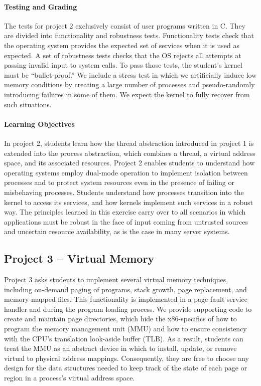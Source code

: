 \paragraph{Testing and Grading}
The tests for project 2 exclusively consist of user programs written in C.
They are divided into functionality and robustness tests.  Functionality tests check that
the operating system provides the expected set of services when it is used as
expected.  A set of robustness tests checks that the OS rejects all attempts at passing
invalid input to system calls.  To pass those tests, the student's kernel must be 
``bullet-proof.'' We include a stress test in which we artificially induce low memory
conditions by creating a large number of processes and pseudo-randomly introducing
failures in some of them.  We expect the kernel to fully recover from such situations.

\paragraph{Learning Objectives}
In project 2, students learn how the thread abstraction introduced in project 1 is 
extended into the process abstraction, which combines a thread, a virtual address space, 
and its associated resources.
Project 2 enables students to understand how operating systems employ dual-mode
operation to implement isolation between processes and to protect system resources
even in the presence of failing or misbehaving processes.  
Students understand how processes transition into the kernel to access its services,
and how kernels implement such services in a robust way.
The principles learned in this exercise carry over to all scenarios
in which applications must be robust in the face of input coming from untrusted 
sources and uncertain resource availability, as is the case in many server systems.

\subsection{Project 3 -- Virtual Memory}
Project 3 asks students to implement several virtual memory techniques, including
on-demand paging of programs, stack growth, page replacement, and memory-mapped files.
This functionality is implemented in a page fault service handler and during the
program loading process.
We provide supporting code to create and maintain page directories, which hide
the x86-specifics of how to program the memory management unit (MMU) and how
to ensure consistency with the CPU's translation look-aside buffer (TLB).  
As a result, students can treat the MMU as an abstract device in which to 
install, update, or remove virtual to physical address mappings.
Consequently, they are free to choose any design for the data structures needed to
keep track of the state of each page or region in a process's virtual address 
space.

